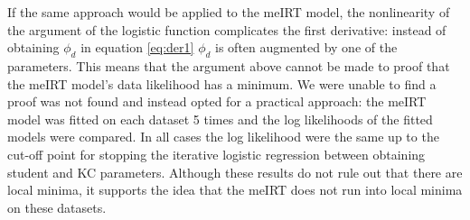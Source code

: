 \documentclass{scrartcl}
\newcommand\todo[1]{\textit{\textcolor{red}{#1}}}
\begin{document}
If the same approach would be applied to the meIRT model, the nonlinearity of the argument of the logistic function complicates the first derivative: instead of obtaining $\phi_{d}$ in equation \ref{eq:der1} $\phi_{d}$ is often augmented by one of the parameters. This means that the argument above cannot be made to proof that the meIRT model's data likelihood has a minimum. We were unable to find a proof was not found and instead opted for a practical approach: the meIRT model was fitted on each dataset 5 times and the log likelihoods of the fitted models were compared. In all cases the log likelihood were the same up to the cut-off point for stopping the iterative logistic regression between obtaining student and KC parameters. Although these results do not rule out that there are local minima, it supports the idea that the meIRT does not run into local minima on these datasets.

\end{document}
